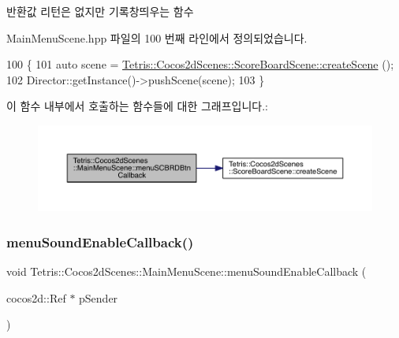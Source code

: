 \begin{DoxyReturn}{반환값}
리턴은 없지만 기록창띄우는 함수 
\end{DoxyReturn}


Main\+Menu\+Scene.\+hpp 파일의 100 번째 라인에서 정의되었습니다.


\begin{DoxyCode}
100                                                   \{
101         \textcolor{keyword}{auto} scene = \hyperlink{class_tetris_1_1_cocos2d_scenes_1_1_score_board_scene_abedba06354b1f03d3f395e4c1841b8a6}{Tetris::Cocos2dScenes::ScoreBoardScene::createScene}
      ();
102         Director::getInstance()->pushScene(scene);
103     \}
\end{DoxyCode}
이 함수 내부에서 호출하는 함수들에 대한 그래프입니다.\+:
\nopagebreak
\begin{figure}[H]
\begin{center}
\leavevmode
\includegraphics[width=350pt]{dc/d34/class_tetris_1_1_cocos2d_scenes_1_1_main_menu_scene_a2fdee3d586584f0186569ccd13d2d7fc_cgraph}
\end{center}
\end{figure}
\mbox{\label{class_tetris_1_1_cocos2d_scenes_1_1_main_menu_scene_a0a6113964573664add11cd1e08ffdd03}} 
\subsubsection{\texorpdfstring{menu\+Sound\+Enable\+Callback()}{menuSoundEnableCallback()}}
{\footnotesize\ttfamily void Tetris\+::\+Cocos2d\+Scenes\+::\+Main\+Menu\+Scene\+::menu\+Sound\+Enable\+Callback (\begin{DoxyParamCaption}\item[{cocos2d\+::\+Ref $\ast$}]{p\+Sender }\end{DoxyParamCaption})\hspace{0.3cm}{\ttfamily [inline]}}

